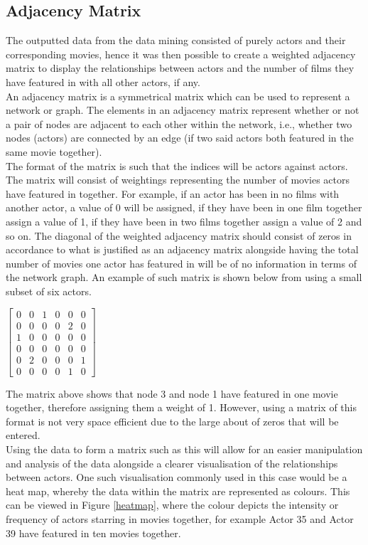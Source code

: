 \documentclass[12pt]{ieeeconf}      %
\begin{document}
\subsection{Adjacency Matrix}
\indent The outputted data from the data mining consisted of purely actors and their corresponding movies, hence it was then possible to create a weighted adjacency matrix to display the relationships between actors and the number of films they have featured in with all other actors, if any.
\\
\indent An adjacency matrix is a symmetrical matrix which can be used to represent a network or graph. The elements in an adjacency matrix represent whether or not a pair of nodes are adjacent to each other within the network, i.e., whether two nodes (actors) are connected by an edge (if two said actors both featured in the same movie together). \cite{wolfram}
\\
\indent The format of the matrix is such that the indices will be actors against actors. The matrix will consist of weightings representing the number of movies actors have featured in together. For example, if an actor has been in no films with another actor, a value of 0 will be assigned, if they have been in one film together assign a value of 1, if they have been in two films together assign a value of 2 and so on. The diagonal of the weighted adjacency matrix should consist of zeros in accordance to what is justified as an adjacency matrix alongside having the total number of movies one actor has featured in will be of no information in terms of the network graph. An example of such matrix is shown below from using a small subset of six actors.    

\begin{center}
$\begin{bmatrix}

    0       & 0 & 1 & 0 & 0 & 0 \\
    0       & 0 & 0 & 0 & 2 & 0 \\
    1       & 0 & 0 & 0 & 0 & 0 \\
    0       & 0 & 0 & 0 & 0 & 0 \\
    0       & 2 & 0 & 0 & 0 & 1 \\
    0       & 0 & 0 & 0 & 1 & 0 
\end{bmatrix}$
\end{center}

\indent The matrix above shows that node 3 and node 1 have featured in one movie together, therefore assigning them a weight of 1. However, using a matrix of this format is not very space efficient due to the large about of zeros that will be entered.
\\
\indent Using the data to form a matrix such as this will allow for an easier manipulation and analysis of the data alongside a clearer visualisation of the relationships between actors. One such visualisation commonly used in this case would be a heat map, whereby the data within the matrix are represented as colours. This can be viewed in Figure \ref{heatmap}, where the colour depicts the intensity or frequency of actors starring in movies together, for example Actor 35 and Actor 39 have featured in ten movies together. 
\end{document}
